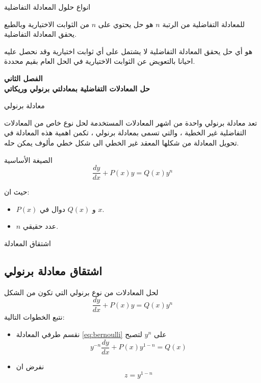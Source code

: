 		\begin{frame}{انواع حلول المعادلة التفاضلية}
		\begin{definition}
						للمعادلة التفاضلية من الرتبة $n$ هو حل يحتوي على $n$ من الثوابت الاختيارية وبالطبع يحقق المعادلة التفاضلية.
		\end{definition}
		\begin{definition}
						هو أي حل يحقق المعادلة التفاضلية لا يشتمل على أي ثوابت اختيارية وقد نحصل عليه احيانا بالتعويض عن الثوابت الاختيارية في الحل العام بقيم محددة.
		\end{definition}
		\end{frame}
		
		\begin{frame}
			\begin{center}
				\Huge
				\textbf{الفصل الثاني}\\
				\textbf{حل المعادلات التفاضلية بمعادلتي برنولي وريكاتي}
			\end{center}
		\end{frame}
		
		\begin{frame}{معادلة برنولي}
			
			تعد معادلة برنولي واحدة من اشهر المعادلات المستخدمة لحل نوع خاص من المعادلات التفاضلية غير الخطية ، والتي تسمى بمعادلة برنولي ، تكمن اهمية هذه المعادلة في تحويل المعادلة من شكلها المعقد غير الخطي الى شكل خطي مألوف يمكن حله.
			\begin{exampleblock}{الصيغة الأساسية}
				\begin{equation}
				\label{eq:bernoulli}
				\frac{dy}{dx} + P(x) y = Q(x) y^n
			\end{equation}
			
			حيث ان:
			\begin{itemize}
				\item $P(x)$ و $Q(x)$ دوال في $x$.
				\item $n$ عدد حقيقي. 
			\end{itemize}
			\end{exampleblock}
		\end{frame}
		
		\begin{frame}{اشتقاق المعادلة}
			\subsection*{اشتقاق معادلة برنولي}
			لحل المعادلات من نوع برنولي التي تكون من الشكل
			\[
			\frac{dy}{dx} + P(x) y = Q(x) y^n \tag{1}
			\]
			نتبع الخطوات التالية:
			\begin{itemize}
				\item نقسم طرفي المعادلة \eqref{eq:bernoulli} على $y^n$ لتصبح
				\begin{equation}
					\label{eq:bernoullidiv}
					y^{-n} \frac{dy}{dx} + P(x) y^{1-n}= Q(x)
				\end{equation}
				
				\item نفرض ان 
				\begin{equation}
					\label{eq:bernoullisub}
					z=y^{1-n}
				\end{equation}
			\end{itemize}
		\end{frame}
		
